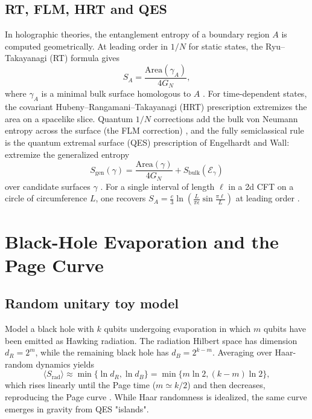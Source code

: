 \documentclass[12pt, numbers, sort&compress]{article}
\begin{document}
\subsection{RT, FLM, HRT and QES}
In holographic theories, the entanglement entropy of a boundary region $A$ is computed geometrically. At leading order in $1/N$ for static states, the Ryu–Takayanagi (RT) formula gives
\begin{equation}
S_A = \frac{\mathrm{Area}(\gamma_A)}{4G_N},
\end{equation}
where $\gamma_A$ is a minimal bulk surface homologous to $A$ \cite{Ryu:2006prl}. For time-dependent states, the covariant Hubeny–Rangamani–Takayanagi (HRT) prescription extremizes the area on a spacelike slice. Quantum $1/N$ corrections add the bulk von Neumann entropy across the surface (the FLM correction) \cite{Faulkner:2013FLM}, and the fully semiclassical rule is the quantum extremal surface (QES) prescription of Engelhardt and Wall: extremize the generalized entropy
\begin{equation}
S_{\text{gen}}(\gamma) = \frac{\mathrm{Area}(\gamma)}{4G_N} + S_{\text{bulk}}(\mathcal{E}_\gamma)
\label{QES}
\end{equation}
over candidate surfaces $\gamma$ \cite{EngelhardtWall:2015QES}. For a single interval of length $\ell$ in a 2d CFT on a circle of circumference $L$, one recovers $S_A = \frac{c}{3}\ln\left(\frac{L}{\pi\epsilon}\sin\frac{\pi\ell}{L}\right)$ at leading order \cite{Ryu:2006prl}.

\section{Black-Hole Evaporation and the Page Curve}

\subsection{Random unitary toy model}
Model a black hole with $k$ qubits undergoing evaporation in which $m$ qubits have been emitted as Hawking radiation. The radiation Hilbert space has dimension $d_R=2^m$, while the remaining black hole has $d_B=2^{k-m}$. Averaging over Haar-random dynamics yields
\begin{equation}
\langle S_{\text{rad}}\rangle \approx \min\{\ln d_R, \ln d_B\} = \min\{m\ln 2, (k-m)\ln 2\},
\end{equation}
which rises linearly until the Page time ($m\simeq k/2$) and then decreases, reproducing the Page curve \cite{Page:1993prl}. While Haar randomness is idealized, the same curve emerges in gravity from QES "islands".
\end{document}

